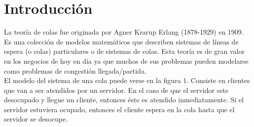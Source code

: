 \documentclass[10pt,journal,compsoc]{IEEEtran}
\begin{document}
\title{}


\author{Lucila Stancato,~
		Dami\'an Modernell,~
		Juan Brasca,~
		Conrado Negro,~%
}


\maketitle

\IEEEdisplaynotcompsoctitleabstractindextext

\IEEEpeerreviewmaketitle

\section{Introducci\'on} %
La teor\'ia de colas fue originada por Agner Krarup Erlang (1878-1929) en 1909. Es una colecci\'on
de modelos matem\'aticos que describen sistemas de l\'ineas de espera (o colas) particulares o de
sistemas de colas. Esta teor\'ia es de gran valor en los negocios de hoy en d\'ia ya que muchos de
sus problemas pueden modelarse como problemas de congesti\'on llegada/partida.\\
El modelo del sistema de una cola puede verse en la figura 1. Consiste en clientes que van a ser
atendidos por un servidor. En el caso de que el servidor este desocupado y llegue un cliente, entonces
\'este es atendido inmediatamente. Si el servidor estuviera ocupado, entonces el cliente espera en la
cola hasta que el servidor se desocupe.\\
\end{document}
